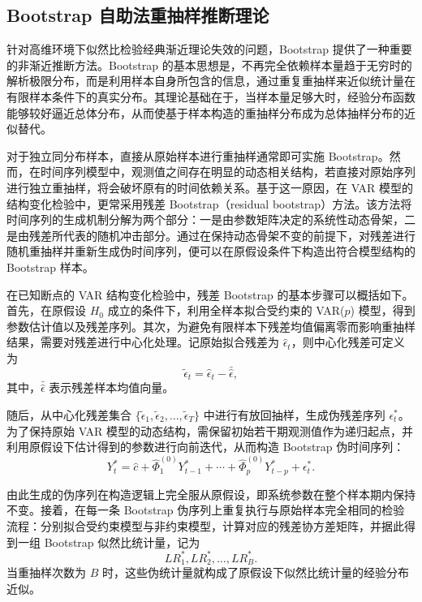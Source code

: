 \documentclass[UTF8,a4paper,12pt]{ctexbook}
\begin{document}
\subsection{Bootstrap 自助法重抽样推断理论}

针对高维环境下似然比检验经典渐近理论失效的问题，Bootstrap 提供了一种重要的非渐近推断方法。Bootstrap 的基本思想是，不再完全依赖样本量趋于无穷时的解析极限分布，而是利用样本自身所包含的信息，通过重复重抽样来近似统计量在有限样本条件下的真实分布。其理论基础在于，当样本量足够大时，经验分布函数能够较好逼近总体分布，从而使基于样本构造的重抽样分布成为总体抽样分布的近似替代。

对于独立同分布样本，直接从原始样本进行重抽样通常即可实施 Bootstrap。然而，在时间序列模型中，观测值之间存在明显的动态相关结构，若直接对原始序列进行独立重抽样，将会破坏原有的时间依赖关系。基于这一原因，在 VAR 模型的结构变化检验中，更常采用残差 Bootstrap（residual bootstrap）方法。该方法将时间序列的生成机制分解为两个部分：一是由参数矩阵决定的系统性动态骨架，二是由残差所代表的随机冲击部分。通过在保持动态骨架不变的前提下，对残差进行随机重抽样并重新生成伪时间序列，便可以在原假设条件下构造出符合模型结构的 Bootstrap 样本。

在已知断点的 VAR 结构变化检验中，残差 Bootstrap 的基本步骤可以概括如下。首先，在原假设 $H_0$ 成立的条件下，利用全样本拟合受约束的 VAR($p$) 模型，得到参数估计值以及残差序列。其次，为避免有限样本下残差均值偏离零而影响重抽样结果，需要对残差进行中心化处理。记原始拟合残差为 $\hat{\epsilon}_t$，则中心化残差可定义为
\begin{equation}
\tilde{\epsilon}_t = \hat{\epsilon}_t - \bar{\hat{\epsilon}},
\end{equation}
其中，$\bar{\hat{\epsilon}}$ 表示残差样本均值向量。

随后，从中心化残差集合 $\{\tilde{\epsilon}_1,\tilde{\epsilon}_2,\dots,\tilde{\epsilon}_T\}$ 中进行有放回抽样，生成伪残差序列 $\epsilon_t^*$。为了保持原始 VAR 模型的动态结构，需保留初始若干期观测值作为递归起点，并利用原假设下估计得到的参数进行向前迭代，从而构造 Bootstrap 伪时间序列：
\begin{equation}
Y_t^* = \hat{c} + \hat{\Phi}_1^{(0)}Y_{t-1}^* + \cdots + \hat{\Phi}_p^{(0)}Y_{t-p}^* + \epsilon_t^*.
\end{equation}

由此生成的伪序列在构造逻辑上完全服从原假设，即系统参数在整个样本期内保持不变。接着，在每一条 Bootstrap 伪序列上重复执行与原始样本完全相同的检验流程：分别拟合受约束模型与非约束模型，计算对应的残差协方差矩阵，并据此得到一组 Bootstrap 似然比统计量，记为
\begin{equation}
LR_1^*,LR_2^*,\dots,LR_B^*.
\end{equation}
当重抽样次数为 $B$ 时，这些伪统计量就构成了原假设下似然比统计量的经验分布近似。
\end{document}
